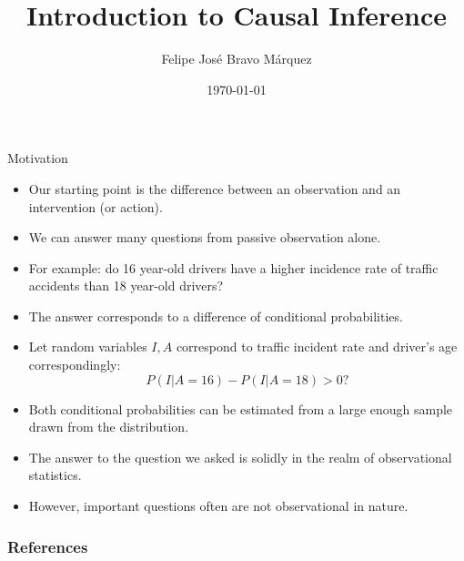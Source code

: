 \documentclass[handout]{beamer}
\title{Introduction to Causal Inference}
\author[Felipe Bravo Márquez]{\footnotesize
 \textcolor[rgb]{0.00,0.00,1.00}{Felipe José Bravo Márquez}}
\date{ \today }
\begin{document}
\begin{frame}
\titlepage


\end{frame}




\begin{frame}{Motivation}
\scriptsize{
\begin{itemize}
\item Our starting point is the difference between an observation and an intervention (or action). 
\item We can answer many questions from passive observation alone.
\item For example: do 16 year-old drivers have a higher incidence rate of traffic accidents than 18 year-old drivers? 
\item The answer corresponds to a difference of conditional probabilities.

\item Let random variables $I,A$ correspond to traffic incident rate and driver's age correspondingly:
\begin{displaymath}
 P(I|A=16)-P(I|A=18)>0?
\end{displaymath}


\item Both conditional probabilities can be estimated from a large enough sample drawn from the distribution.

\item The answer to the question we asked is solidly in the realm of observational statistics.

\item However, important questions often are not observational in nature.

\end{itemize}


} 

\end{frame}




\begin{frame}[allowframebreaks]\scriptsize
\frametitle{References}


%
\end{frame}  









\end{document}
